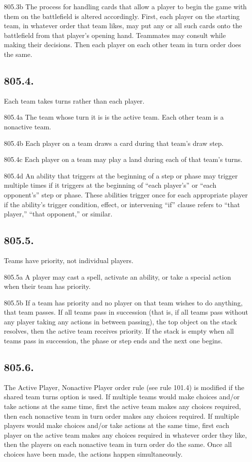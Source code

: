 805.3b The process for handling cards that allow a player to begin the game with them on the battlefield is altered accordingly. First, each player on the starting team, in whatever order that team likes, may put any or all such cards onto the battlefield from that player’s opening hand. Teammates may consult while making their decisions. Then each player on each other team in turn order does the same.

\subsection*{805.4.}
Each team takes turns rather than each player.

805.4a The team whose turn it is is the active team. Each other team is a nonactive team.

805.4b Each player on a team draws a card during that team’s draw step.

805.4c Each player on a team may play a land during each of that team’s turns.

805.4d An ability that triggers at the beginning of a step or phase may trigger multiple times if it triggers at the beginning of “each player’s” or “each opponent’s” step or phase. These abilities trigger once for each appropriate player if the ability’s trigger condition, effect, or intervening “if” clause refers to “that player,” “that opponent,” or similar.

\subsection*{805.5.}
Teams have priority, not individual players.

805.5a A player may cast a spell, activate an ability, or take a special action when their team has priority.

805.5b If a team has priority and no player on that team wishes to do anything, that team passes. If all teams pass in succession (that is, if all teams pass without any player taking any actions in between passing), the top object on the stack resolves, then the active team receives priority. If the stack is empty when all teams pass in succession, the phase or step ends and the next one begins.

\subsection*{805.6.}
The Active Player, Nonactive Player order rule (see rule 101.4) is modified if the shared team turns option is used. If multiple teams would make choices and/or take actions at the same time, first the active team makes any choices required, then each nonactive team in turn order makes any choices required. If multiple players would make choices and/or take actions at the same time, first each player on the active team makes any choices required in whatever order they like, then the players on each nonactive team in turn order do the same. Once all choices have been made, the actions happen simultaneously.

